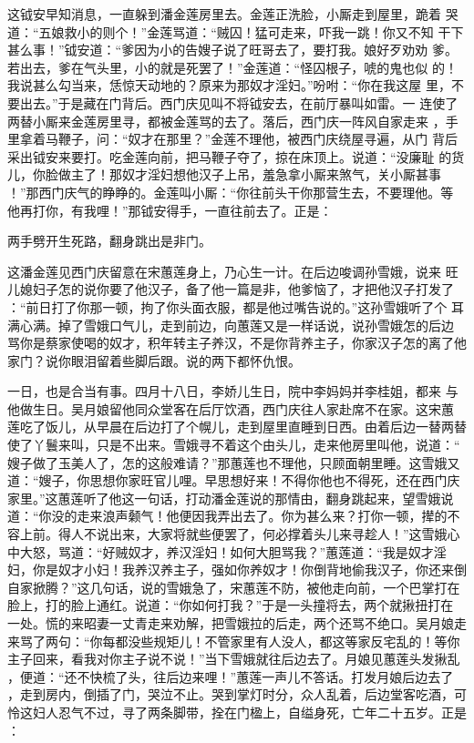 这钺安早知消息，一直躲到潘金莲房里去。金莲正洗脸，小厮走到屋里，跪着
哭道：“五娘救小的则个！”金莲骂道：“贼囚！猛可走来，吓我一跳！你又不知
干下甚么事！”钺安道：“爹因为小的告嫂子说了旺哥去了，要打我。娘好歹劝劝
爹。若出去，爹在气头里，小的就是死罢了！”金莲道：“怪囚根子，唬的鬼也似
的！我说甚么勾当来，恁惊天动地的？原来为那奴才淫妇。”吩咐：“你在我这屋
里，不要出去。”于是藏在门背后。西门庆见叫不将钺安去，在前厅暴叫如雷。一
连使了两替小厮来金莲房里寻，都被金莲骂的去了。落后，西门庆一阵风自家走来
，手里拿着马鞭子，问：“奴才在那里？”金莲不理他，被西门庆绕屋寻遍，从门
背后采出钺安来要打。吃金莲向前，把马鞭子夺了，掠在床顶上。说道：“没廉耻
的货儿，你脸做主了！那奴才淫妇想他汉子上吊，羞急拿小厮来煞气，关小厮甚事
！”那西门庆气的睁睁的。金莲叫小厮：“你往前头干你那营生去，不要理他。等
他再打你，有我哩！”那钺安得手，一直往前去了。正是：

两手劈开生死路，翻身跳出是非门。

这潘金莲见西门庆留意在宋蕙莲身上，乃心生一计。在后边唆调孙雪娥，说来
旺儿媳妇子怎的说你要了他汉子，备了他一篇是非，他爹恼了，才把他汉子打发了
：“前日打了你那一顿，拘了你头面衣服，都是他过嘴告说的。”这孙雪娥听了个
耳满心满。掉了雪娥口气儿，走到前边，向蕙莲又是一样话说，说孙雪娥怎的后边
骂你是蔡家使喝的奴才，积年转主子养汉，不是你背养主子，你家汉子怎的离了他
家门？说你眼泪留着些脚后跟。说的两下都怀仇恨。

一日，也是合当有事。四月十八日，李娇儿生日，院中李妈妈并李桂姐，都来
与他做生日。吴月娘留他同众堂客在后厅饮酒，西门庆往人家赴席不在家。这宋蕙
莲吃了饭儿，从早晨在后边打了个幌儿，走到屋里直睡到日西。由着后边一替两替
使了丫鬟来叫，只是不出来。雪娥寻不着这个由头儿，走来他房里叫他，说道：“
嫂子做了玉美人了，怎的这般难请？”那蕙莲也不理他，只顾面朝里睡。这雪娥又
道：“嫂子，你思想你家旺官儿哩。早思想好来！不得你他也不得死，还在西门庆
家里。”这蕙莲听了他这一句话，打动潘金莲说的那情由，翻身跳起来，望雪娥说
道：“你没的走来浪声颡气！他便因我弄出去了。你为甚么来？打你一顿，撵的不
容上前。得人不说出来，大家将就些便罢了，何必撑着头儿来寻趁人！”这雪娥心
中大怒，骂道：“好贼奴才，养汉淫妇！如何大胆骂我？”蕙莲道：“我是奴才淫
妇，你是奴才小妇！我养汉养主子，强如你养奴才！你倒背地偷我汉子，你还来倒
自家掀腾？”这几句话，说的雪娥急了，宋蕙莲不防，被他走向前，一个巴掌打在
脸上，打的脸上通红。说道：“你如何打我？”于是一头撞将去，两个就揪扭打在
一处。慌的来昭妻一丈青走来劝解，把雪娥拉的后走，两个还骂不绝口。吴月娘走
来骂了两句：“你每都没些规矩儿！不管家里有人没人，都这等家反宅乱的！等你
主子回来，看我对你主子说不说！”当下雪娥就往后边去了。月娘见蕙莲头发揪乱
，便道：“还不快梳了头，往后边来哩！”蕙莲一声儿不答话。打发月娘后边去了
，走到房内，倒插了门，哭泣不止。哭到掌灯时分，众人乱着，后边堂客吃酒，可
怜这妇人忍气不过，寻了两条脚带，拴在门楹上，自缢身死，亡年二十五岁。正是
：

